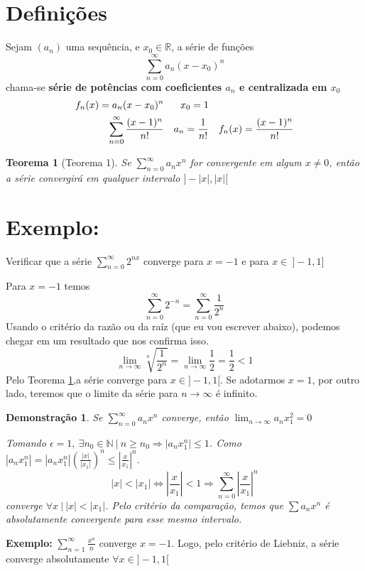 \documentclass[12pt,openany, letterpaper]{book}
\newtheorem{theorem}{Teorema}[section]
\newtheorem{demonstration}{Demonstração}
\newcommand{\LI}[1][n]{\lim_{{#1} \rightarrow \infty}}
\newcommand{\soma}[2][n]{\sum_{{#1} = #2}^\infty}
\begin{document}
{{\section{Definições}
Sejam $(a_n)$ uma sequência, e $x_0 \in \mathds{R}$, a série de funções $$\soma{0} a_n (x-x_0)^n$$ chama-se \textbf{série de potências com coeficientes $a_n$ e centralizada em $x_0$} 
\begin{align*}
f_n(x) = a_n (x-x_0)^n & & x_0 =1\\
\soma{0} {(x-1)^n \over n!} & & a_n = \frac{1}{n!} &  & f_n(x) = {(x-1)^n \over n!}
\end{align*}

\begin{theorem}[Teorema 1]\label{T:5-1}
Se $\displaystyle{\soma{0} a_n x^n}$ for convergente em algum $x \neq 0$, então a série convergirá em qualquer  intervalo  $]-|x|, |x|[$
\end{theorem}

\section*{\textbf{Exemplo:}}{ Verificar que a série $\displaystyle{\soma{0} 2^{nx}}$ converge para $x = -1$ e para $x \in \ ]-1,1]$}

Para $x = -1$ temos $$\soma{0} 2^{-n} = \soma{0} \frac{1}{2^n}$$ Usando o critério da razão ou da raíz (que eu vou escrever abaixo), podemos chegar em um resultado que nos confirma isso. $$\LI \sqrt[n]{\frac{1}{2^n}} = \LI \frac{1}{2} = \frac{1}{2} < 1$$ Pelo Teorema \ref{T:5-1},a série converge para $x \in ]-1,1[$. Se adotarmos $x= 1$, por outro lado, teremos que o limite da série para $n \rightarrow \infty$ é infinito.

\begin{demonstration}
 Se $\displaystyle{\soma{0} a_n x^n}$ converge, então $\displaystyle{\LI a_n  x_1^2 = 0}$
 
 Tomando $\epsilon = 1, \  \exists n_0 \in \mathds{N} \ | \ n \geq n_0 \Rightarrow |a_n x_1^n| \leq 1$. Como $|a_n x_1^n|  = |a_n x_1^n| \left(\frac{|x|}{|x_1|}\right)^n \leq \left|\frac{x}{x_1}\right|^n$. $$ |x| < |x_1| \Longleftrightarrow \left|\frac{x}{x_1}\right| < 1 \Rightarrow \soma{0} \left|\frac{x}{x_1}\right|^n $$ converge $\forall x \ | \ |x| <|x_1|$. Pelo critério da comparação, temos que $\sum a_n x^n$ é absolutamente convergente para esse mesmo intervalo.
\end{demonstration}

\hspace{5mm}\textbf{Exemplo:} $\displaystyle{\soma{1} \frac{x^n}{n}}$ converge $x = -1$. Logo, pelo critério de Liebniz, a série converge absolutamente $\forall x \in ]-1,1[$

}}
\end{document}
